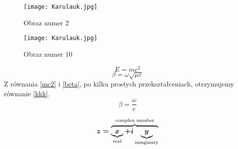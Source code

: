   

\begin{figure}
  \centering
  \texttt{[image: Karulauk.jpg]}
  \caption{Obraz numer 2}
  \label{figure:example1}
\end{figure}

\begin{figure}[ht]
  \centering
  \texttt{[image: Karulauk.jpg]}
  \caption{Obraz numer 10}
  \label{figure10}
\end{figure}


\begin{equation} \label{mc2}
E = mc^2
\end{equation}
\begin{equation} \label{beta}
\beta = \omega\sqrt{\mu\varepsilon}
\end{equation}
Z równania \eqref{mc2} i \eqref{beta}, po kilku prostych przekształceniach, otrzymujemy równanie \eqref{kkk}.
\begin{equation} \label{kkk}
\beta = \frac{\omega}{c}
\end{equation}

\begin{equation} \label{test}
\boldmath
z = \overbrace{
    \underbrace{x}_\text{real} + i
    \underbrace{y}_\text{imaginary}
    }^\text{complex number}
\end{equation}